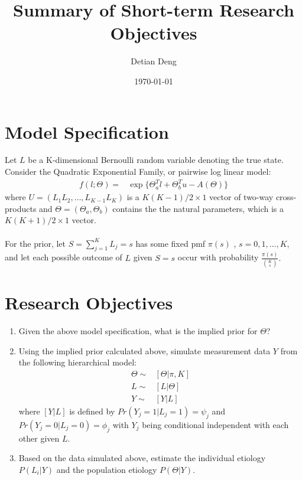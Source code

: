 \documentclass[11 pt, a4paper]{article}  %
\begin{document}
\title{Summary of Short-term Research Objectives}   %
\author{Detian Deng}         %
\date{\today}    %
\maketitle


\section{Model Specification}             %
Let $L$ be a K-dimensional Bernoulli random variable denoting the true state.
Consider the Quadratic Exponential Family, or pairwise log linear model:
\begin{align*}
f(l; \Theta) = & \exp \{\Theta_a^T l + \Theta_b^{T} u - A(\Theta)\}
\end{align*}
where $U = (L_{1}L_{2}, \ldots, L_{K-1}L_{K})$ is a $K(K-1)/2 \times 1$ vector of two-way cross-products and $\Theta = (\Theta_a, \Theta_b)$ contains the the natural parameters, which is a $K(K+1)/2 \times 1$ vector.\\
\ \\
For the prior, let $S = \sum_{j=1}^K L_j = s$ has some fixed pmf $\pi(s)$ , $s = 0,1,\ldots, K$, and let each possible outcome of $L$ given $S = s$ occur with probability $\frac{\pi(s)}{{K \choose s}}.$\\

\section{Research Objectives}
\begin{enumerate}
\item Given the above model specification, what is the implied prior for $\Theta$?
\item Using the implied prior calculated above, simulate measurement data $Y$ from the following hierarchical model:
\begin{align*}
\Theta \sim & [\Theta | \pi, K]\\
L \sim & [L | \Theta]\\
Y \sim & [Y | L]
\end{align*}
where $[Y | L]$ is defined by $Pr(Y_j=1|L_j=1) = \psi_j$ and $Pr(Y_j=0|L_j=0) = \phi_j$ with $Y_j$ being conditional independent with each other given $L$.
\item Based on the data simulated above, estimate the individual etiology $P(L_i |Y)$ and the population etiology $P(\Theta |Y)$.
\end{enumerate}
\end{document}

